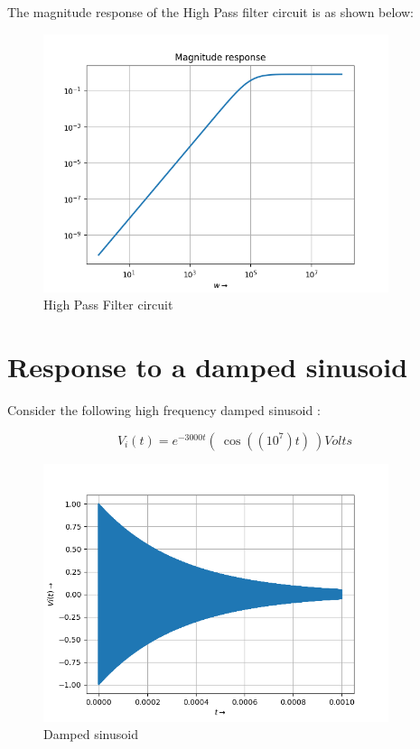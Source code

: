 \documentclass[10pt,a4paper]{article}
\begin{document}
The magnitude response of the High Pass filter circuit is as shown below:

\begin{figure}[!tbh]

\includegraphics[width = 0.9\textwidth]{high pass filter magnitude response.png}
\caption{High Pass Filter circuit}

\end{figure}

\section{Response to a damped sinusoid}

Consider the following high frequency damped sinusoid :

\begin{equation*}
    V_{i}(t) = e^{-3000t}( \ \cos((10^7)t) \ ) Volts
\end{equation*}

\begin{figure}[!tbh]

\includegraphics[width = 0.9\textwidth]{high frequency damped input.png}
\caption{Damped sinusoid}

\end{figure}
\end{document}
